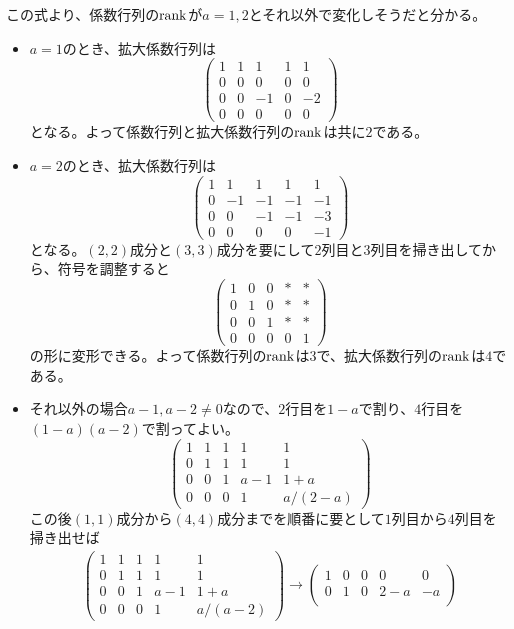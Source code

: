 この式より、係数行列の$\operatorname{rank}$が$a = 1, 2$とそれ以外で変化しそうだと分かる。
\begin{itemize}
\item $a = 1$のとき、拡大係数行列は
\[
\begin{pmatrix}
1 & 1 & 1 & 1 & 1 \\
0 & 0 & 0 & 0 & 0 \\
0 & 0 & -1 & 0 & - 2 \\
0 & 0 & 0 & 0 & 0
\end{pmatrix}
\]
となる。よって係数行列と拡大係数行列の$\operatorname{rank}$は共に$2$である。
\item $a = 2$のとき、拡大係数行列は
\[
\begin{pmatrix}
1 & 1 & 1 & 1 & 1 \\
0 & -1 & -1 & -1 & -1 \\
0 & 0 & -1 & -1 & -3 \\
0 & 0 & 0 & 0 & -1
\end{pmatrix}
\]
となる。$(2, 2)$成分と$(3, 3)$成分を要にして$2$列目と$3$列目を掃き出してから、符号を調整すると
\[
\begin{pmatrix}
1 & 0 & 0 & * & * \\
0 & 1 & 0 & * & * \\
0 & 0 & 1 & * & * \\
0 & 0 & 0 & 0 & 1
\end{pmatrix}
\]
の形に変形できる。よって係数行列の$\operatorname{rank}$は$3$で、拡大係数行列の$\operatorname{rank}$は$4$である。
\item それ以外の場合$a - 1, a - 2 \neq 0$なので、$2$行目を$1 - a$で割り、$4$行目を$(1 - a)(a - 2)$で割ってよい。
\[
\begin{pmatrix}
1 & 1 & 1 & 1 & 1 \\
0 & 1 & 1 & 1 & 1 \\
0 & 0 & 1 & a - 1 & 1 + a \\
0 & 0 & 0 & 1 & a/(2 - a)
\end{pmatrix}
\]
この後$(1, 1)$成分から$(4, 4)$成分までを順番に要として$1$列目から$4$列目を掃き出せば
\begin{align*}
\begin{pmatrix}
1 & 1 & 1 & 1 & 1 \\
0 & 1 & 1 & 1 & 1 \\
0 & 0 & 1 & a - 1 & 1 + a \\
0 & 0 & 0 & 1 & a/(a - 2)
\end{pmatrix}
\rightarrow
\begin{pmatrix}
1 & 0 & 0 & 0 & 0 \\
0 & 1 & 0 & 2 - a & -a \\

\end{pmatrix}
\end{align*}
\end{itemize}
